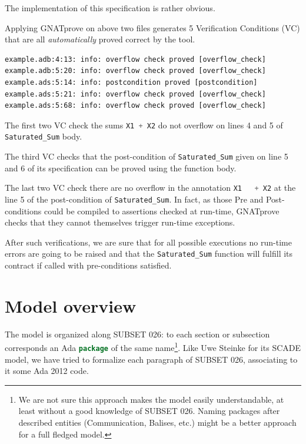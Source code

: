 \documentclass{template/openetcs_report}
\newcommand{\Ada}[1]{\lstinline[language=Ada,basicstyle={\sffamily},framesep=0pt]{#1}}
\begin{document}


The implementation of this specification is rather obvious.



Applying GNATprove on above two files generates 5 Verification
Conditions (VC) that are all \emph{automatically} proved correct by
the tool.

\begin{lstlisting}
example.adb:4:13: info: overflow check proved [overflow_check]
example.adb:5:20: info: overflow check proved [overflow_check]
example.ads:5:14: info: postcondition proved [postcondition]
example.ads:5:21: info: overflow check proved [overflow_check]
example.ads:5:68: info: overflow check proved [overflow_check]
\end{lstlisting}

The first two VC check the sums \Ada{X1 + X2} do not overflow on lines
4 and 5 of \Ada{Saturated_Sum} body.

The third VC checks that the post-condition of \Ada{Saturated_Sum}
given on line 5 and 6 of its specification can be proved using the
function body.

The last two VC check there are no overflow in the annotation \Ada{X1
  + X2} at the line 5 of the post-condition of \Ada{Saturated_Sum}. In
fact, as those Pre and Post-conditions could be compiled to assertions
checked at run-time, GNATprove checks that they cannot themselves
trigger run-time exceptions.

After such verifications, we are sure that for all possible executions
no run-time errors are going to be raised and that the
\Ada{Saturated_Sum} function will fulfill its contract if called with
pre-conditions satisfied.

\chapter{Model overview}

The model is organized along SUBSET 026: to each section or subsection
corresponds an Ada \Ada{package} of the same name\footnote{We are not
  sure this approach makes the model easily understandable, at least
  without a good knowledge of SUBSET 026. Naming packages after
  described entities (Communication, Balises, etc.) might be a better
  approach for a full fledged model.}. Like Uwe Steinke for its SCADE
model, we have tried to formalize each paragraph of SUBSET 026,
associating to it some Ada 2012 code.
\end{document}
